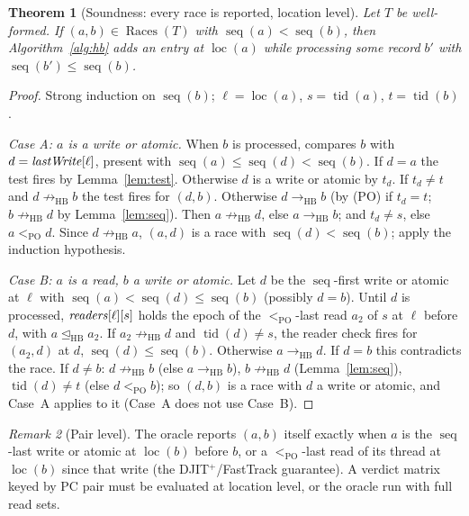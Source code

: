 \documentclass[11pt]{article}
\newtheorem{theorem}{Theorem}
\theoremstyle{remark}
\newtheorem{remark}[theorem]{Remark}
\DeclareMathOperator{\tid}{tid}
\DeclareMathOperator{\seq}{seq}
\DeclareMathOperator{\loc}{loc}
\DeclareMathOperator{\Races}{Races}
\newcommand{\HB}{\to_{\mathrm{HB}}}
\newcommand{\HBr}{\trianglelefteq_{\mathrm{HB}}}
\newcommand{\PO}{<_{\mathrm{PO}}}
\begin{document}
\begin{theorem}[Soundness: every race is reported, location level]\label{thm:sound}
Let $T$ be well-formed. If $(a,b)\in\Races(T)$ with $\seq(a)<\seq(b)$, then
Algorithm~\ref{alg:hb} adds an entry at $\loc(a)$ while processing some
record $b'$ with $\seq(b')\le\seq(b)$.
\end{theorem}
\begin{proof}
Strong induction on $\seq(b)$; $\ell=\loc(a)$, $s=\tid(a)$, $t=\tid(b)$.

\emph{Case A: $a$ is a write or atomic.} When $b$ is processed, \Check{}
compares $b$ with $d=\mathit{lastWrite}[\ell]$, present with
$\seq(a)\le\seq(d)<\seq(b)$. If $d=a$ the test fires by
Lemma~\ref{lem:test}. Otherwise $d$ is a write or atomic by $t_d$. If
$t_d\ne t$ and $d\not\HB b$ the test fires for $(d,b)$. Otherwise $d\HB b$
(by (PO) if $t_d=t$; $b\not\HB d$ by Lemma~\ref{lem:seq}). Then
$a\not\HB d$, else $a\HB b$; and $t_d\ne s$, else $a\PO d$. Since
$d\not\HB a$, $(a,d)$ is a race with $\seq(d)<\seq(b)$; apply the induction
hypothesis.

\emph{Case B: $a$ is a read, $b$ a write or atomic.} Let $d$ be the
$\seq$-first write or atomic at $\ell$ with $\seq(a)<\seq(d)\le\seq(b)$
(possibly $d=b$). Until $d$ is processed, $\mathit{readers}[\ell][s]$
holds the epoch of the $\PO$-last read $a_2$ of $s$ at $\ell$ before $d$, with
$a\HBr a_2$. If $a_2\not\HB d$ and $\tid(d)\ne s$, the reader check fires for
$(a_2,d)$ at $d$, $\seq(d)\le\seq(b)$. Otherwise $a\HB d$. If $d=b$ this
contradicts the race. If $d\ne b$: $d\not\HB b$ (else $a\HB b$),
$b\not\HB d$ (Lemma~\ref{lem:seq}), $\tid(d)\ne t$ (else $d\PO b$); so
$(d,b)$ is a race with $d$ a write or atomic, and Case~A applies to it (Case~A
does not use Case~B).
\end{proof}

\begin{remark}[Pair level]
The oracle reports $(a,b)$ itself exactly when $a$ is the $\seq$-last write or
atomic at $\loc(b)$ before $b$, or a $\PO$-last read of its thread at
$\loc(b)$ since that write (the DJIT$^+$/FastTrack guarantee). A verdict
matrix keyed by PC pair must be evaluated at location level, or the oracle run
with full read sets.
\end{remark}
\end{document}
